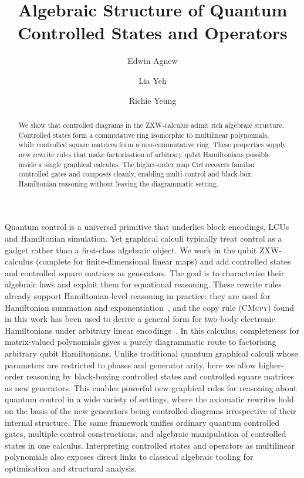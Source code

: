 \documentclass{eptcs}
\title{Algebraic Structure of Quantum Controlled States and Operators}
\author{Edwin Agnew \and Lia Yeh \and Richie Yeung}
\newcommand{\Control}{\textsf{Ctrl}}
\newcommand{\Rule}[1]{\textsc{#1}}
\newcommand{\CMcpy}{\Rule{CMcpy}}
\begin{document}
\maketitle

\begin{abstract}
We show that controlled diagrams in the ZXW-calculus admit rich algebraic structure. Controlled states form a commutative ring isomorphic to multilinear polynomials, while controlled square matrices form a non-commutative ring. These properties supply new rewrite rules that make factorisation of arbitrary qubit Hamiltonians possible inside a single graphical calculus. The higher-order map $\Control$ recovers familiar controlled gates and composes cleanly, enabling multi-control and black-box Hamiltonian reasoning without leaving the diagrammatic setting.
\end{abstract}

Quantum control is a universal primitive that underlies block encodings, LCUs and Hamiltonian simulation. Yet graphical calculi typically treat control as a gadget rather than a first-class algebraic object. We work in the qubit ZXW-calculus (complete for finite-dimensional linear maps) and add controlled states and controlled square matrices as generators. The goal is to characterise their algebraic laws and exploit them for equational reasoning.
These rewrite rules already support Hamiltonian-level reasoning in practice: they are used for Hamiltonian summation and exponentiation~\cite{shaikh2022sum}, and the copy rule (\CMcpy) found in this work has been used to derive a general form for two-body electronic Hamiltonians under arbitrary linear encodings~\cite{mcdowallrose2025f2q}.
In this calculus, completeness for matrix-valued polynomials gives a purely diagrammatic route to factorising arbitrary qubit Hamiltonians.
Unlike traditional quantum graphical calculi whose parameters are restricted to phases and generator arity, here we allow higher-order reasoning by black-boxing controlled states and controlled square matrices as new generators.
This enables powerful new graphical rules for reasoning about quantum control in a wide variety of settings, where the axiomatic rewrites hold on the basis of the new generators being controlled diagrams irrespective of their internal structure.
The same framework unifies ordinary quantum controlled gates, multiple-control constructions, and algebraic manipulation of controlled states in one calculus. Interpreting controlled states and operators as multilinear polynomials also exposes direct links to classical algebraic tooling for optimisation and structural analysis.
\end{document}
